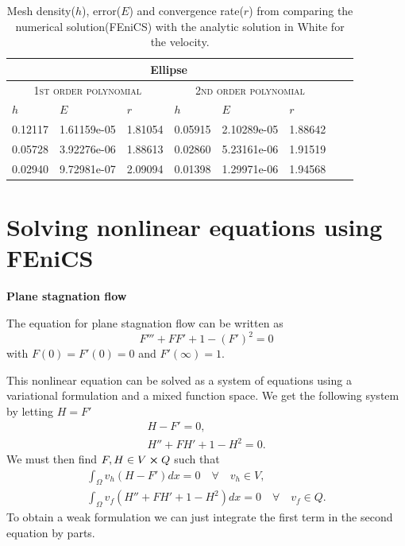 \documentclass[11pt,a4paper,english]{article}
\numberwithin{equation}{section}
\begin{document}
\begin{table}[H]
\centering
\caption{Mesh density($h$), error($E$) and convergence rate($r$) from comparing the numerical solution(FEniCS) with the analytic solution in White for the velocity. }
\vspace{3mm}
\begin{tabular}{|l|l|l|l|l|l|l|l|}
\hline
 \multicolumn{6}{|c|}{\textbf{Ellipse}}   \\
\hline
 \multicolumn{3}{|c|}{ \textsc{1st order polynomial}} &  \multicolumn{3}{|c|}{\textsc{2nd order polynomial}}  \\
\hline
$h$ & $E$ & $r$ & $h$ & $E$ & $r$   \\
\hline
0.12117 & 1.61159e-05 & 1.81054 & 0.05915 & 2.10289e-05 & 1.88642 \\
0.05728 & 3.92276e-06 & 1.88613 & 0.02860 & 5.23161e-06 & 1.91519 \\
0.02940 & 9.72981e-07 & 2.09094 & 0.01398 & 1.29971e-06 & 1.94568 \\
\hline
\end{tabular}
\label{tab:time}
\end{table}


\section{Solving nonlinear equations using FEniCS}

\textbf{Plane stagnation flow}

The equation for plane stagnation flow can be written as
\begin{equation}
F''' + FF' + 1 - (F')^2 = 0
\end{equation}
with $F(0) = F'(0) = 0$ and $F'(\infty)=1$.

This nonlinear equation can be solved as a system of equations using a variational formulation and a mixed function space. We get the following system by letting $H=F'$
\begin{align}
H - F' = 0, \\
H'' + FH' + 1 - H^2 = 0.
\end{align}
We must then find $F,H \in V \cross Q$ such that 
\begin{align*}
\int_\Omega v_h(H - F') dx =0 \quad \forall \quad v_h \in V, \\
\int_\Omega v_f(H'' + FH' + 1 - H^2) dx = 0 \quad \forall \quad  v_f \in Q.
\end{align*}
To obtain a weak formulation we can just integrate the first term in the second equation by parts. 
\end{document}
